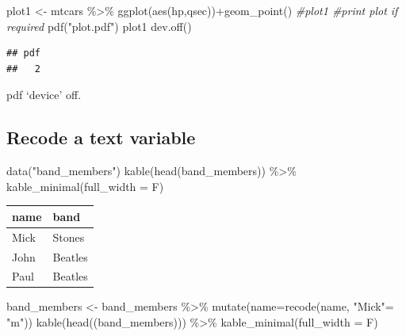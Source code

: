 \documentclass[
]{article}
\newenvironment{Shaded}{\begin{snugshade}}{\end{snugshade}}
\newcommand{\AttributeTok}[1]{\textcolor[rgb]{0.77,0.63,0.00}{#1}}
\newcommand{\CommentTok}[1]{\textcolor[rgb]{0.56,0.35,0.01}{\textit{#1}}}
\newcommand{\FunctionTok}[1]{\textcolor[rgb]{0.00,0.00,0.00}{#1}}
\newcommand{\NormalTok}[1]{#1}
\newcommand{\OtherTok}[1]{\textcolor[rgb]{0.56,0.35,0.01}{#1}}
\newcommand{\SpecialCharTok}[1]{\textcolor[rgb]{0.00,0.00,0.00}{#1}}
\newcommand{\StringTok}[1]{\textcolor[rgb]{0.31,0.60,0.02}{#1}}
\begin{document}
\begin{Shaded}
\begin{Highlighting}[]
\NormalTok{plot1 }\OtherTok{\textless{}{-}}\NormalTok{ mtcars }\SpecialCharTok{\%\textgreater{}\%} \FunctionTok{ggplot}\NormalTok{(}\FunctionTok{aes}\NormalTok{(hp,qsec))}\SpecialCharTok{+}\FunctionTok{geom\_point}\NormalTok{()}
\CommentTok{\#plot1 \#print plot if required}
\FunctionTok{pdf}\NormalTok{(}\StringTok{"plot.pdf"}\NormalTok{)}
\NormalTok{plot1}
\FunctionTok{dev.off}\NormalTok{()}
\end{Highlighting}
\end{Shaded}

\begin{verbatim}
## pdf 
##   2
\end{verbatim}

pdf `device' off.

\hypertarget{recode-a-text-variable}{%
\subsection{Recode a text variable}\label{recode-a-text-variable}}

\begin{Shaded}
\begin{Highlighting}[]
\FunctionTok{data}\NormalTok{(}\StringTok{"band\_members"}\NormalTok{)}
\FunctionTok{kable}\NormalTok{(}\FunctionTok{head}\NormalTok{(band\_members)) }\SpecialCharTok{\%\textgreater{}\%} \FunctionTok{kable\_minimal}\NormalTok{(}\AttributeTok{full\_width =}\NormalTok{ F)}
\end{Highlighting}
\end{Shaded}

\begin{table}
\centering
\begin{tabular}{l|l}
\hline
name & band\\
\hline
Mick & Stones\\
\hline
John & Beatles\\
\hline
Paul & Beatles\\
\hline
\end{tabular}
\end{table}

\begin{Shaded}
\begin{Highlighting}[]
\NormalTok{band\_members }\OtherTok{\textless{}{-}}\NormalTok{ band\_members }\SpecialCharTok{\%\textgreater{}\%} \FunctionTok{mutate}\NormalTok{(}\AttributeTok{name=}\FunctionTok{recode}\NormalTok{(name, }\StringTok{"Mick"}\OtherTok{=} \StringTok{"m"}\NormalTok{))}
\FunctionTok{kable}\NormalTok{(}\FunctionTok{head}\NormalTok{((band\_members))) }\SpecialCharTok{\%\textgreater{}\%} \FunctionTok{kable\_minimal}\NormalTok{(}\AttributeTok{full\_width =}\NormalTok{ F)}
\end{Highlighting}
\end{Shaded}
\end{document}
